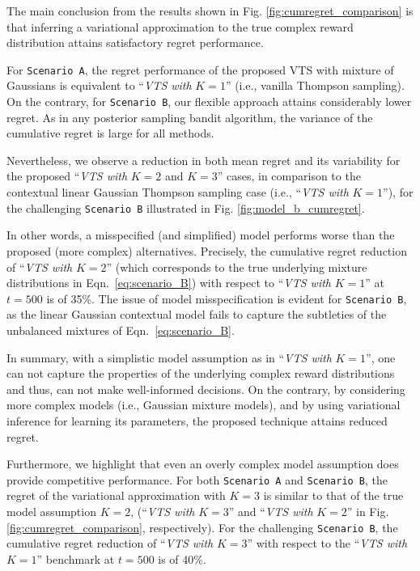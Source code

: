 \documentclass{article}
\newcommand{\ie}{i.e., }
\begin{document}
The main conclusion from the results shown in Fig. \ref{fig:cumregret_comparison} is that inferring a variational approximation to the true complex reward distribution attains satisfactory regret performance.

For \texttt{Scenario A}, the regret performance of the proposed VTS with mixture of Gaussians is equivalent to ``\textit{VTS with }$K=1$'' (\ie vanilla Thompson sampling). On the contrary, for \texttt{Scenario B}, our flexible approach attains considerably lower regret. As in any posterior sampling bandit algorithm, the variance of the cumulative regret is large for all methods.

Nevertheless, we observe a reduction in both mean regret and its variability for the proposed ``\textit{VTS with }$K=2$ and $K=3$'' cases, in comparison to the contextual linear Gaussian Thompson sampling case (\ie ``\textit{VTS with }$K=1$''), for the challenging \texttt{Scenario B} illustrated in Fig. \ref{fig:model_b_cumregret}.

In other words, a misspecified (and simplified) model performs worse than the proposed (more complex) alternatives. Precisely, the cumulative regret reduction of ``\textit{VTS with }$K=2$'' (which corresponds to the true underlying mixture distributions in Eqn.~\eqref{eq:scenario_B}) with respect to ``\textit{VTS with }$K=1$'' at $t=500$ is of 35\%. The issue of model misspecification is evident for \texttt{Scenario B}, as the linear Gaussian contextual model fails to capture the subtleties of the unbalanced mixtures of Eqn.~\eqref{eq:scenario_B}.

In summary, with a simplistic model assumption as in ``\textit{VTS with }$K=1$'', one can not capture the properties of the underlying complex reward distributions and thus, can not make well-informed decisions. On the contrary, by considering more complex models (\ie Gaussian mixture models), and by using variational inference for learning its parameters, the proposed technique attains reduced regret.

Furthermore, we highlight that even an overly complex model assumption does provide competitive performance. For both \texttt{Scenario A} and \texttt{Scenario B}, the regret of the variational approximation with $K=3$ is similar to that of the true model assumption $K=2$, (``\textit{VTS with }$K=3$'' and ``\textit{VTS with }$K=2$'' in Fig. \ref{fig:cumregret_comparison}, respectively). For the challenging \texttt{Scenario B}, the cumulative regret reduction of ``\textit{VTS with }$K=3$'' with respect to the ``\textit{VTS with }$K=1$'' benchmark at $t=500$ is of 40\%. 
\end{document}
